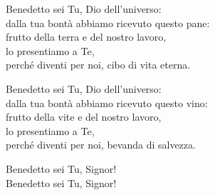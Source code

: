 
\strofa Benedetto sei Tu, Dio dell'universo:\\
dalla tua bontà abbiamo ricevuto questo pane:\\
frutto della terra e del nostro lavoro,\\
lo presentiamo a Te,\\
perché diventi per noi, cibo di vita eterna.

\spazio

\strofa Benedetto sei Tu, Dio dell'universo:\\
dalla tua bontà abbiamo ricevuto questo vino:\\
frutto della vite e del nostro lavoro,\\
lo presentiamo a Te,\\
perché diventi per noi, bevanda di salvezza.

\spazio

Benedetto sei Tu, Signor!\\
Benedetto sei Tu, Signor!